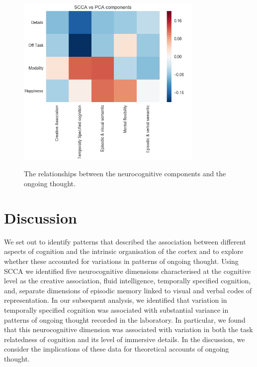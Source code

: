 \begin{figure}[H]
    \centering
    \includegraphics[width=0.8\textwidth]{study3/image/pca_cca_corr.png}
    \caption{The relationships between the neurocognitive components and the ongoing thought.}
    \caption*{
    \footnotesize{
    }
    }
    \label{fig:study3:figcorr}
\end{figure}

\section{Discussion}
\label{study3:discussion}

We set out to identify patterns that described the association between different aspects of cognition and the intrinsic organisation of the cortex and to explore whether these accounted for variations in patterns of ongoing thought. Using SCCA we identified five neurocognitive dimensions characterised at the cognitive level as the creative association, fluid intelligence, temporally specified cognition, and, separate dimensions of episodic memory linked to visual and verbal codes of representation. In our subsequent analysis, we identified that variation in temporally specified cognition was associated with substantial variance in patterns of ongoing thought recorded in the laboratory. In particular, we found that this neurocognitive dimension was associated with variation in both the task relatedness of cognition and its level of immersive details. In the discussion, we consider the implications of these data for theoretical accounts of ongoing thought.

